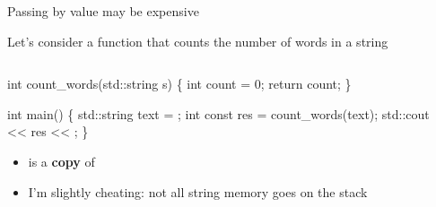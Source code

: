 \begin{frame}[fragile]{Passing by value may be expensive}

  Let's consider a function that counts the number of words in a string

  \begin{columns}
    \begin{column}{.5\textwidth}

      \begin{codeblock}
int count_words(std::string \alert<5>{s})
\{
  int count = 0;
  \ddd
  return count;
\}

\alert<2>{int main()
\{
  std::string text} \alert<3>{= \ddd};
  \alert<2>{int const res} = \alert<4>{count_words(}\alert<5>{text}\alert<4>{)};
  std::cout <{}< res <{}< \bslashn;
\alert<2>{\}}\end{codeblock}

      \begin{itemize}
      \item<5->  is a \textbf{copy} of 
      \item<6-> I'm slightly cheating: not all string memory goes on the stack
      \end{itemize}

    \end{column}

    \begin{column}{.4\textwidth}


\end{column}
\end{columns}
\end{frame}
